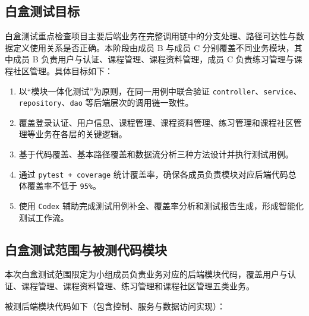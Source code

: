 \documentclass[12pt,a4paper]{ctexart}
\begin{document}
\subsection{白盒测试目标}

白盒测试重点检查项目主要后端业务在完整调用链中的分支处理、路径可达性与数据定义使用关系是否正确。本阶段由成员 B 与成员 C 分别覆盖不同业务模块，其中成员 B 负责用户与认证、课程管理、课程资料管理，成员 C 负责练习管理与课程社区管理。具体目标如下：

\begin{enumerate}
  \item 以“模块一体化测试”为原则，在同一用例中联合验证 \texttt{controller}、\texttt{service}、\texttt{repository}、\texttt{dao} 等后端层次的调用链一致性。
  \item 覆盖登录认证、用户信息、课程管理、课程资料管理、练习管理和课程社区管理等业务在各层的关键逻辑。
  \item 基于代码覆盖、基本路径覆盖和数据流分析三种方法设计并执行测试用例。
  \item 通过 \texttt{pytest + coverage} 统计覆盖率，确保各成员负责模块对应后端代码总体覆盖率不低于 \texttt{95\%}。
  \item 使用 \texttt{Codex} 辅助完成测试用例补全、覆盖率分析和测试报告生成，形成智能化测试工作流。
\end{enumerate}

\subsection{白盒测试范围与被测代码模块}

本次白盒测试范围限定为小组成员负责业务对应的后端模块代码，覆盖用户与认证、课程管理、课程资料管理、练习管理和课程社区管理五类业务。

被测后端模块代码如下（包含控制、服务与数据访问实现）：
\end{document}
